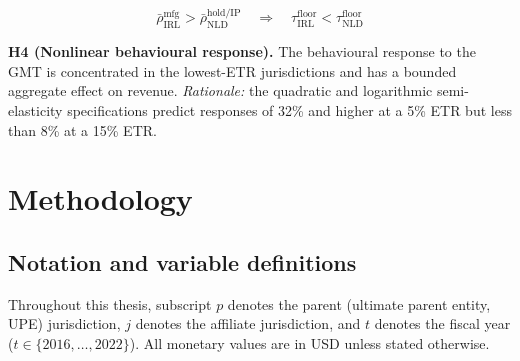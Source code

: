 \documentclass[11pt,a4paper]{article}
\begin{document}
\begin{equation}\label{eq:irl_nld_hypothesis}
\bar{\rho}_{\text{IRL}}^{\text{mfg}} > \bar{\rho}_{\text{NLD}}^{\text{hold/IP}} \quad \Longrightarrow \quad \tau_{\text{IRL}}^{\text{floor}} < \tau_{\text{NLD}}^{\text{floor}}
\end{equation}

\textbf{H4 (Nonlinear behavioural response).} The behavioural response to the GMT is concentrated in the lowest-ETR jurisdictions and has a bounded aggregate effect on revenue. \emph{Rationale:} the quadratic \citep{dowd2017} and logarithmic \citep{garcia-bernardo2024} semi-elasticity specifications predict responses of 32\% and higher at a 5\% ETR but less than 8\% at a 15\% ETR.


\newpage
\section{Methodology}\label{sec:methodology}

\subsection{Notation and variable definitions}\label{sec:notation}

Throughout this thesis, subscript $p$ denotes the parent (ultimate parent entity, UPE) jurisdiction, $j$ denotes the affiliate jurisdiction, and $t$ denotes the fiscal year ($t \in \{2016, \ldots, 2022\}$). All monetary values are in USD unless stated otherwise.
\end{document}
